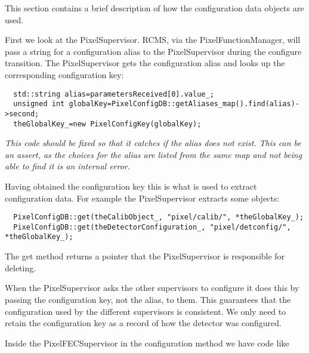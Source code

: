 
This section contains a brief description of how the configuration data 
objects are used. 

First we look at the PixelSupervisor. RCMS, via the PixelFunctionManager,
will pass a string for a configuration alias to the PixelSupervisor
during the configure transition. The PixelSupervisor gets the configuration
alias and looks up the corresponding configuration key:
\begin{verbatim}
  std::string alias=parametersReceived[0].value_;
  unsigned int globalKey=PixelConfigDB::getAliases_map().find(alias)->second;
  theGlobalKey_=new PixelConfigKey(globalKey);
\end{verbatim}
{\it This code should be fixed so that it catches if the alias does
not exist. This can be an assert, as the choices for the alias are
listed from the same map and not being able to find it is an internal
error.}

Having obtained the configuration key this is what is used to extract
configuration data. For example the PixelSupervisor extracts some
objects:
\begin{verbatim}
  PixelConfigDB::get(theCalibObject_, "pixel/calib/", *theGlobalKey_);
  PixelConfigDB::get(theDetectorConfiguration_, "pixel/detconfig/", *theGlobalKey_);
\end{verbatim}
The get method returns a pointer that the PixelSupervisor is responsible
for deleting.

When the PixelSupervisor asks the other supervisors to configure it does
this by passing the configuration key, not the alias, to them. This
guarantees that the configuration used by the different supervisors 
is consistent. We only need to retain the configuration key as a record
of how the detector was configured.

Inside the PixelFECSupervisor in the configuration method we have code 
like

